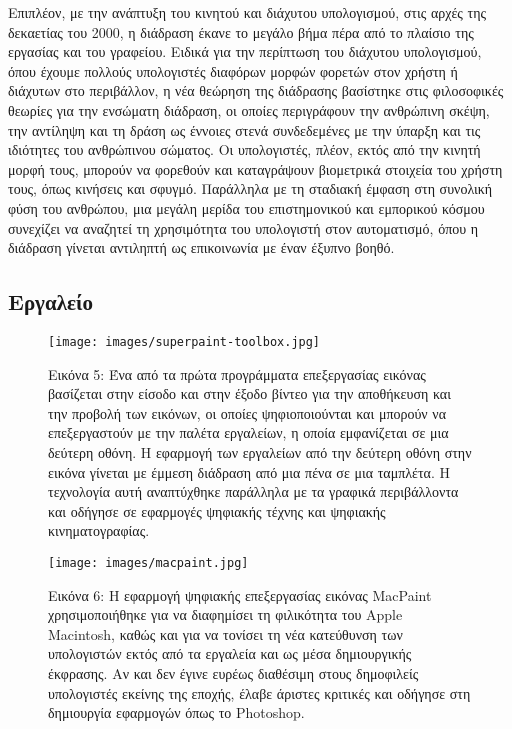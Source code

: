 \documentclass[
]{article}
\begin{document}
Επιπλέον, με την ανάπτυξη του κινητού και διάχυτου υπολογισμού, στις
αρχές της δεκαετίας του 2000, η διάδραση έκανε το μεγάλο βήμα πέρα από
το πλαίσιο της εργασίας και του γραφείου. Ειδικά για την περίπτωση του
διάχυτου υπολογισμού, όπου έχουμε πολλούς υπολογιστές διαφόρων μορφών
φορετών στον χρήστη ή διάχυτων στο περιβάλλον, η νέα θεώρηση της
διάδρασης βασίστηκε στις φιλοσοφικές θεωρίες για την ενσώματη διάδραση,
οι οποίες περιγράφουν την ανθρώπινη σκέψη, την αντίληψη και τη δράση ως
έννοιες στενά συνδεδεμένες με την ύπαρξη και τις ιδιότητες του
ανθρώπινου σώματος. Οι υπολογιστές, πλέον, εκτός από την κινητή μορφή
τους, μπορούν να φορεθούν και καταγράψουν βιομετρικά στοιχεία του χρήστη
τους, όπως κινήσεις και σφυγμό. Παράλληλα με τη σταδιακή έμφαση στη
συνολική φύση του ανθρώπου, μια μεγάλη μερίδα του επιστημονικού και
εμπορικού κόσμου συνεχίζει να αναζητεί τη χρησιμότητα του υπολογιστή
στον αυτοματισμό, όπου η διάδραση γίνεται αντιληπτή ως επικοινωνία με
έναν έξυπνο βοηθό.

\hypertarget{ux3b5ux3c1ux3b3ux3b1ux3bbux3b5ux3afux3bf}{%
\subsection{Εργαλείο}\label{ux3b5ux3c1ux3b3ux3b1ux3bbux3b5ux3afux3bf}}

\leavevmode{}%
\begin{figure}
\hypertarget{fig:superpaint-toolbox}{%
\centering
\texttt{[image: images/superpaint-toolbox.jpg]}
\caption{Εικόνα 5: Ένα από τα πρώτα προγράμματα επεξεργασίας εικόνας
βασίζεται στην είσοδο και στην έξοδο βίντεο για την αποθήκευση και την
προβολή των εικόνων, οι οποίες ψηφιοποιούνται και μπορούν να
επεξεργαστούν με την παλέτα εργαλείων, η οποία εμφανίζεται σε μια
δεύτερη οθόνη. Η εφαρμογή των εργαλείων από την δεύτερη οθόνη στην
εικόνα γίνεται με έμμεση διάδραση από μια πένα σε μια ταμπλέτα. Η
τεχνολογία αυτή αναπτύχθηκε παράλληλα με τα γραφικά περιβάλλοντα και
οδήγησε σε εφαρμογές ψηφιακής τέχνης και ψηφιακής
κινηματογραφίας.}\label{fig:superpaint-toolbox}
}
\end{figure}

\leavevmode{}%
\begin{figure}
\hypertarget{fig:macpaint}{%
\centering
\texttt{[image: images/macpaint.jpg]}
\caption{Εικόνα 6: Η εφαρμογή ψηφιακής επεξεργασίας εικόνας MacPaint
χρησιμοποιήθηκε για να διαφημίσει τη φιλικότητα του Apple Macintosh,
καθώς και για να τονίσει τη νέα κατεύθυνση των υπολογιστών εκτός από τα
εργαλεία και ως μέσα δημιουργικής έκφρασης. Αν και δεν έγινε ευρέως
διαθέσιμη στους δημοφιλείς υπολογιστές εκείνης της εποχής, έλαβε άριστες
κριτικές και οδήγησε στη δημιουργία εφαρμογών όπως το
Photoshop.}\label{fig:macpaint}
}
\end{figure}
\end{document}
